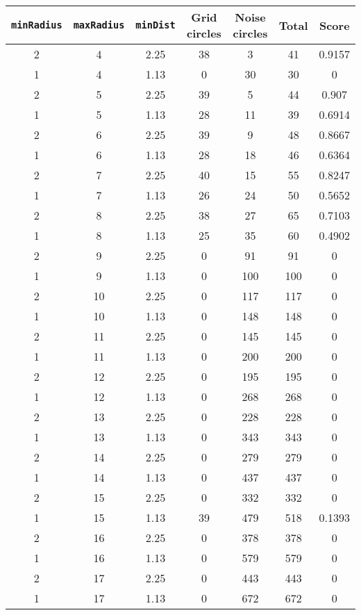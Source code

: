 \documentclass[letterpaper, 12pt]{article}
\begin{document}
\begin{longtable}{|c|c|c|c|c|c|c|}
\hline
\textbf{\texttt{minRadius}} & \textbf{\texttt{maxRadius}} & \textbf{\texttt{minDist}} & \textbf{Grid circles} & \textbf{Noise circles} & \textbf{Total} & \textbf{Score} \\
\hline
2 & 4 & 2.25 & 38 & 3 & 41 & 0.9157 \\
\hline
1 & 4 & 1.13 & 0 & 30 & 30 & 0 \\
\hline
2 & 5 & 2.25 & 39 & 5 & 44 & 0.907 \\
\hline
1 & 5 & 1.13 & 28 & 11 & 39 & 0.6914 \\
\hline
2 & 6 & 2.25 & 39 & 9 & 48 & 0.8667 \\
\hline
1 & 6 & 1.13 & 28 & 18 & 46 & 0.6364 \\
\hline
2 & 7 & 2.25 & 40 & 15 & 55 & 0.8247 \\
\hline
1 & 7 & 1.13 & 26 & 24 & 50 & 0.5652 \\
\hline
2 & 8 & 2.25 & 38 & 27 & 65 & 0.7103 \\
\hline
1 & 8 & 1.13 & 25 & 35 & 60 & 0.4902 \\
\hline
2 & 9 & 2.25 & 0 & 91 & 91 & 0 \\
\hline
1 & 9 & 1.13 & 0 & 100 & 100 & 0 \\
\hline
2 & 10 & 2.25 & 0 & 117 & 117 & 0 \\
\hline
1 & 10 & 1.13 & 0 & 148 & 148 & 0 \\
\hline
2 & 11 & 2.25 & 0 & 145 & 145 & 0 \\
\hline
1 & 11 & 1.13 & 0 & 200 & 200 & 0 \\
\hline
2 & 12 & 2.25 & 0 & 195 & 195 & 0 \\
\hline
1 & 12 & 1.13 & 0 & 268 & 268 & 0 \\
\hline
2 & 13 & 2.25 & 0 & 228 & 228 & 0 \\
\hline
1 & 13 & 1.13 & 0 & 343 & 343 & 0 \\
\hline
2 & 14 & 2.25 & 0 & 279 & 279 & 0 \\
\hline
1 & 14 & 1.13 & 0 & 437 & 437 & 0 \\
\hline
2 & 15 & 2.25 & 0 & 332 & 332 & 0 \\
\hline
1 & 15 & 1.13 & 39 & 479 & 518 & 0.1393 \\
\hline
2 & 16 & 2.25 & 0 & 378 & 378 & 0 \\
\hline
1 & 16 & 1.13 & 0 & 579 & 579 & 0 \\
\hline
2 & 17 & 2.25 & 0 & 443 & 443 & 0 \\
\hline
1 & 17 & 1.13 & 0 & 672 & 672 & 0 \\

\end{longtable}
\end{document}
